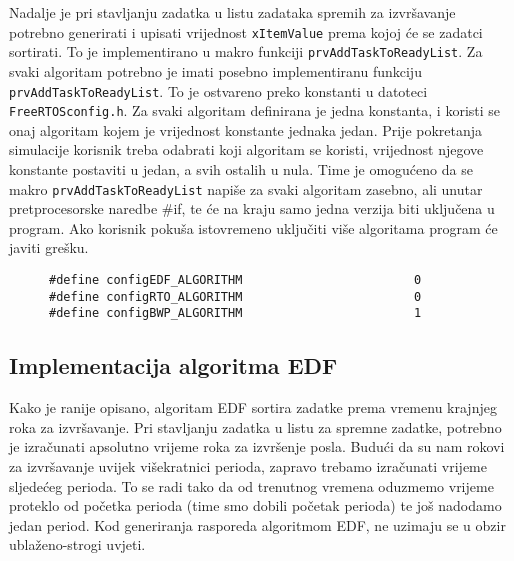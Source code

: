 \documentclass[../zavrsni.tex]{subfiles}
\begin{document}

Nadalje je pri stavljanju zadatka u listu zadataka spremih za izvršavanje potrebno generirati i upisati vrijednost \texttt{xItemValue}
prema kojoj će se zadatci sortirati. To je implementirano u makro funkciji \texttt{prvAddTaskToReadyList}. Za svaki algoritam 
potrebno je imati posebno implementiranu funkciju \texttt{prvAddTaskToReadyList}. To je ostvareno preko konstanti u datoteci 
\texttt{FreeRTOSconfig.h}. Za svaki algoritam definirana je jedna konstanta, i koristi se onaj algoritam kojem je vrijednost konstante jednaka jedan.
Prije pokretanja simulacije korisnik treba odabrati koji algoritam se koristi, vrijednost njegove konstante postaviti u jedan, a svih 
ostalih u nula. Time je omogućeno da se makro \texttt{prvAddTaskToReadyList} napiše za svaki algoritam zasebno, ali unutar pretprocesorske
naredbe \#if, te će na kraju samo jedna verzija biti uključena u program. Ako korisnik pokuša istovremeno uključiti više 
algoritama program će javiti grešku.

\begin{figure}[h]
\centering
\begin{lstlisting}[style=CStyle,caption={Primjer uključenja algoritma BWP},captionpos=b]
#define configEDF_ALGORITHM                        0
#define configRTO_ALGORITHM                        0
#define configBWP_ALGORITHM                        1
\end{lstlisting}
\end{figure}

\subsection{Implementacija algoritma EDF}

Kako je ranije opisano, algoritam EDF sortira zadatke prema vremenu krajnjeg roka za izvršavanje. Pri stavljanju zadatka u 
listu za spremne zadatke, potrebno je izračunati apsolutno vrijeme roka za izvršenje posla. Budući da su nam rokovi za izvršavanje
uvijek višekratnici perioda, zapravo trebamo izračunati vrijeme sljedećeg perioda. To se radi tako da od trenutnog vremena 
oduzmemo vrijeme proteklo od početka perioda (time smo dobili početak perioda) te još nadodamo jedan period. 
Kod generiranja rasporeda algoritmom EDF, ne uzimaju se u obzir ublaženo-strogi uvjeti.
\end{document}
